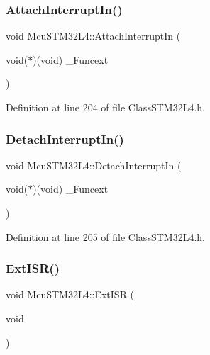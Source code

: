\subsubsection{\texorpdfstring{Attach\+Interrupt\+In()}{AttachInterruptIn()}\hspace{0.1cm}{\footnotesize\ttfamily [2/2]}}
{\footnotesize\ttfamily void Mcu\+S\+T\+M32\+L4\+::\+Attach\+Interrupt\+In (\begin{DoxyParamCaption}\item[{void($\ast$)(void)}]{\+\_\+\+Funcext }\end{DoxyParamCaption})\hspace{0.3cm}{\ttfamily [inline]}}



Definition at line 204 of file Class\+S\+T\+M32\+L4.\+h.

\mbox{\label{class_mcu_s_t_m32_l4_a7cc86d66c729307b6b618f5f32139f61}} 
\subsubsection{\texorpdfstring{Detach\+Interrupt\+In()}{DetachInterruptIn()}}
{\footnotesize\ttfamily void Mcu\+S\+T\+M32\+L4\+::\+Detach\+Interrupt\+In (\begin{DoxyParamCaption}\item[{void($\ast$)(void)}]{\+\_\+\+Funcext }\end{DoxyParamCaption})\hspace{0.3cm}{\ttfamily [inline]}}



Definition at line 205 of file Class\+S\+T\+M32\+L4.\+h.

\mbox{\label{class_mcu_s_t_m32_l4_a0059d78e27e65734ad243cc0a5272fc4}} 
\subsubsection{\texorpdfstring{Ext\+I\+S\+R()}{ExtISR()}}
{\footnotesize\ttfamily void Mcu\+S\+T\+M32\+L4\+::\+Ext\+I\+SR (\begin{DoxyParamCaption}\item[{void}]{ }\end{DoxyParamCaption})\hspace{0.3cm}{\ttfamily [inline]}}

